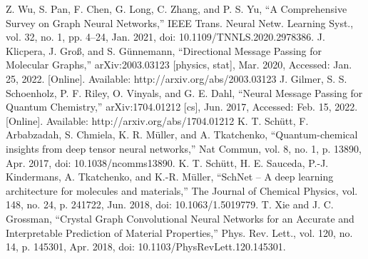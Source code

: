 \documentclass{article}
\begin{document}
\begin{thebibliography}{99}
    Z. Wu, S. Pan, F. Chen, G. Long, C. Zhang, and P. S. Yu, “A Comprehensive Survey on Graph Neural Networks,” IEEE Trans. Neural Netw. Learning Syst., vol. 32, no. 1, pp. 4–24, Jan. 2021, doi: 10.1109/TNNLS.2020.2978386.
    J. Klicpera, J. Groß, and S. Günnemann, “Directional Message Passing for Molecular Graphs,” arXiv:2003.03123 [physics, stat], Mar. 2020, Accessed: Jan. 25, 2022. [Online]. Available: http://arxiv.org/abs/2003.03123
    J. Gilmer, S. S. Schoenholz, P. F. Riley, O. Vinyals, and G. E. Dahl, “Neural Message Passing for Quantum Chemistry,” arXiv:1704.01212 [cs], Jun. 2017, Accessed: Feb. 15, 2022. [Online]. Available: http://arxiv.org/abs/1704.01212
    K. T. Schütt, F. Arbabzadah, S. Chmiela, K. R. Müller, and A. Tkatchenko, “Quantum-chemical insights from deep tensor neural networks,” Nat Commun, vol. 8, no. 1, p. 13890, Apr. 2017, doi: 10.1038/ncomms13890.
    K. T. Schütt, H. E. Sauceda, P.-J. Kindermans, A. Tkatchenko, and K.-R. Müller, “SchNet – A deep learning architecture for molecules and materials,” The Journal of Chemical Physics, vol. 148, no. 24, p. 241722, Jun. 2018, doi: 10.1063/1.5019779.
    T. Xie and J. C. Grossman, “Crystal Graph Convolutional Neural Networks for an Accurate and Interpretable Prediction of Material Properties,” Phys. Rev. Lett., vol. 120, no. 14, p. 145301, Apr. 2018, doi: 10.1103/PhysRevLett.120.145301.
\end{thebibliography}
\end{document}
